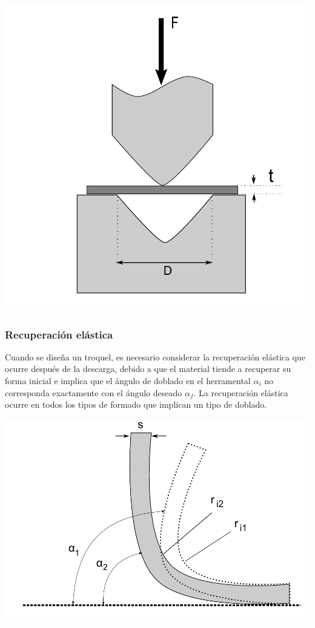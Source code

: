 \begin{center}
\includegraphics[scale=0.4]{src/ch2/fuerza_doblado}
\label{fig:fuerza_doblado}
\end{center}


\subsubsection{Recuperación elástica}

Cuando se diseña un troquel, es necesario considerar la recuperación elástica 
que ocurre después de la descarga, debido a que el material tiende a recuperar su forma 
inicial e implica que el ángulo de doblado en el herramental $\alpha_i$ no corresponda exactamente con el 
ángulo deseado $\alpha_f$. La recuperación elástica ocurre en todos los tipos de formado 
que implican un tipo de doblado.\\

\begin{center}
\includegraphics[scale=0.4]{src/ch2/springback}
\label{fig:springback}
\end{center}

